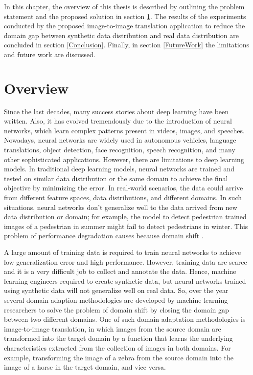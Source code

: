 \justifying
\setlength{\parskip}{1em}



In this chapter, the overview of this thesis is described by outlining the problem statement and the proposed solution in section \ref{Overview}. The results of the experiments conducted by the proposed image-to-image translation application to reduce the domain gap between synthetic data distribution and real data distribution are concluded in section \ref{Conclusion}. Finally, in section \ref{FutureWork} the limitations and future work are discussed.


\section{Overview}\label{Overview}

Since the last decades, many success stories about deep learning have been written. Also, it has evolved tremendously due to the introduction of neural networks, which learn complex patterns present in videos, images, and speeches. Nowadays, neural networks are widely used in autonomous vehicles, language translations, object detection, face recognition, speech recognition, and many other sophisticated applications. However, there are limitations to deep learning models. In traditional deep learning models, neural networks are trained and tested on similar data distribution or the same domain to achieve the final objective by minimizing the error. In real-world scenarios, the data could arrive from different feature spaces, data distributions, and different domains. In such situations, neural networks don't generalize well to the data arrived from new data distribution or domain; for example, the model to detect pedestrian trained images of a pedestrian in summer might fail to detect pedestrians in winter. This problem of performance degradation causes because domain shift \cite{farahani2020brief}.

A large amount of training data is required to train neural networks to achieve low generalization error and high performance. However, training data are scarce and it is a very difficult job to collect and annotate the data. Hence, machine learning engineers required to create synthetic data, but neural networks trained using synthetic data will not generalize well on real data. So, over the year several domain adaption methodologies are developed by machine learning researchers to solve the problem of domain shift by closing the domain gap between two different domains\cite{farahani2020brief}. One of such domain adaptation methodologies is image-to-image translation, in which images from the source domain are transformed into the target domain by a function that learns the underlying characteristics extracted from the collection of images in both domains. For example, transforming the image of a zebra from the source domain into the image of a horse in the target domain, and vice versa.


